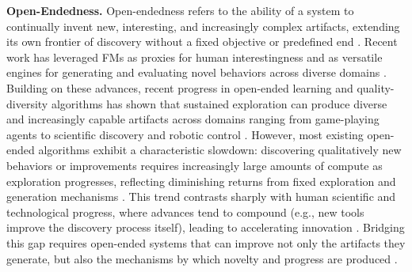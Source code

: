 \documentclass[]{fairmeta}
\begin{document}
\textbf{Open-Endedness.}
Open-endedness refers to the ability of a system to continually invent new, interesting, and increasingly complex artifacts, extending its own frontier of discovery without a fixed objective or predefined end \citep{stanley2017open, hughes2024open}. Recent work has leveraged FMs as proxies for human interestingness and as versatile engines for generating and evaluating novel behaviors across diverse domains \citep{zhangomni, faldoromni}. Building on these advances, recent progress in open-ended learning \citep{huautomated, zoph2017neural, colas2023augmenting, lehman2023evolution} and quality-diversity algorithms \citep{lehman2011evolving, mouret2015illuminating, bradley2023quality, samvelyan2024rainbow, dingquality, pourcel2023aces, coiffard2025overcoming, dharna2025foundation, yuan2026agenticred} has shown that sustained exploration can produce diverse and increasingly capable artifacts across domains ranging from game-playing agents \citep{klissarov2023motif, klissarovmaestromotif, wangvoyager} to scientific discovery \citep{lu2024discovering, lu2024ai, romera2024mathematical, novikov2025alphaevolve, audran2025does} and robotic control \citep{cully2015robots, grillotti2025tabula}. However, most existing open-ended algorithms exhibit a characteristic slowdown: discovering qualitatively new behaviors or improvements requires increasingly large amounts of compute as exploration progresses, reflecting diminishing returns from fixed exploration and generation mechanisms \citep{zhangomni, faldoromni, huautomated}. This trend contrasts sharply with human scientific and technological progress, where advances tend to compound (e.g., new tools improve the discovery process itself), leading to accelerating innovation \citep{good1966speculations, kwa2025measuring}. Bridging this gap requires open-ended systems that can improve not only the artifacts they generate, but also the mechanisms by which novelty and progress are produced \citep{clune2019ai, jiang2023general}.
\end{document}
